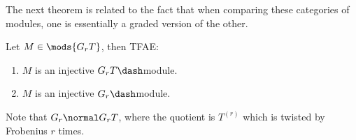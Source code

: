 The next theorem is related to the fact that when comparing these
categories of modules, one is essentially a graded version of the other.

\begin{theorem}[?]

Let \(M\in\mods{G_rT}\), then TFAE:

\begin{enumerate}
\def\labelenumi{\arabic{enumi}.}
\tightlist
\item
  \(M\) is an injective \(G_r T\dash\)module.
\item
  \(M\) is an injective \(G_r\dash\)module.
\end{enumerate}

\end{theorem}

Note that \(G_r \normal G_r T\), where the quotient is \(T^{(r)}\) which
is twisted by Frobenius \(r\) times.


